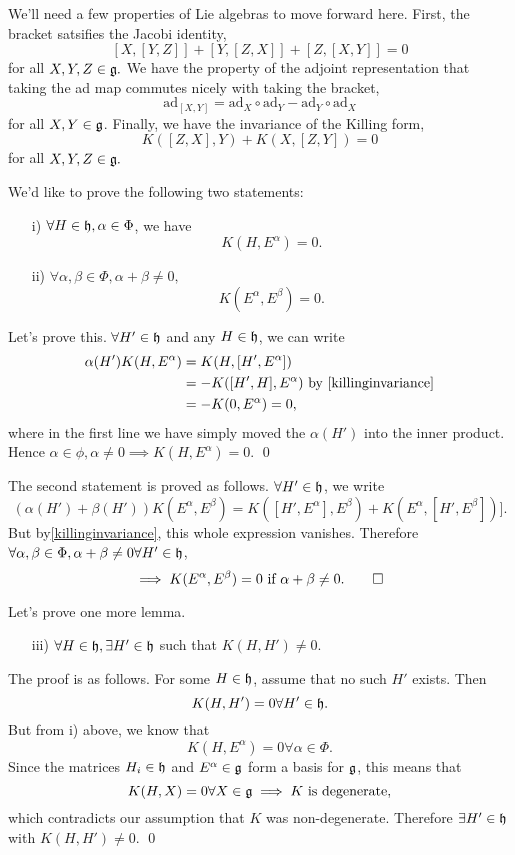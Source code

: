 We'll need a few properties of Lie algebras to move forward here. First, the bracket satsifies the Jacobi identity,
\begin{equation}\label{jacobi}
    [X,[Y,Z]]+[Y,[Z,X]]+[Z,[X,Y]]=0
\end{equation}
for all $X,Y,Z\in \mathfrak{g}.$
We have the property of the adjoint representation that taking the ad map commutes nicely with taking the bracket,
\begin{equation}
    \text{ad}_{[X,Y]}=\text{ad}_X \circ \text{ad}_Y-\text{ad}_Y \circ \text{ad}_X
\end{equation}
for all $X,Y\in \mathfrak{g}$.
Finally, we have the invariance of the Killing form,
\begin{equation}\label{killinginvariance}
    K([Z,X],Y)+K(X,[Z,Y])=0
\end{equation}
for all $X,Y,Z\in \mathfrak{g}.$

We'd like to prove the following two statements:
\begin{enumerate}
    \item[i)] $\forall H\in \mathfrak{h},\alpha\in \Phi$, we have
    $$K(H,E^\alpha)=0.$$
    \item[ii)] $\forall \alpha,\beta\in \Phi, \alpha+\beta \neq 0,$
    $$K(E^\alpha,E^\beta)=0.$$
\end{enumerate}

Let's prove this. $\forall H'\in \mathfrak{h}$ and any $H\in \mathfrak{h}$, we can write
\begin{align*}
\alpha(H')K(H,E^\alpha)&= K(H,[H',E^\alpha])\\
&=-K([H',H],E^\alpha)\text{ by \ref{killinginvariance}}\\
&=-K(0,E^\alpha)=0,
\end{align*}
where in the first line we have simply moved the $\alpha(H')$ into the inner product. Hence $\alpha \in \phi, \alpha\neq 0 \implies K(H,E^\alpha)=0.$ \qed

The second statement is proved as follows. $\forall H'\in \mathfrak{h}$, we write
$$(\alpha(H')+\beta(H'))K(E^\alpha,E^\beta)=K([H',E^\alpha],E^\beta)+K(E^\alpha,[H',E^\beta])].$$
But by\ref{killinginvariance}, this whole expression vanishes. Therefore
$\forall\alpha,\beta\in \Phi, \alpha+\beta \neq 0 \forall H'\in \mathfrak{h}$,
$$\implies K(E^\alpha,E^\beta)=0 \text{ if } \alpha+\beta \neq 0. \qed$$

Let's prove one more lemma. 
\begin{itemize}
    \item[iii)] $\forall H\in \mathfrak{h}, \exists H'\in \mathfrak{h}$ such that $K(H,H')\neq 0.$
\end{itemize}
The proof is as follows. For some $H\in \mathfrak{h}$, assume that no such $H'$ exists. Then $$K(H,H')=0\forall H'\in \mathfrak{h}.$$ But from i) above, we know that
$$K(H,E^\alpha)=0\forall \alpha \in \Phi.$$
Since the matrices $H_i\in \mathfrak{h}$ and $E^\alpha\in \mathfrak{g}$ form a basis for $\mathfrak{g}$, this means that $$K(H,X)=0\forall X \in \mathfrak{g} \implies K \text{ is degenerate}, $$
which contradicts our assumption that $K$ was non-degenerate. Therefore $\exists H'\in \mathfrak{h}$ with $K(H,H')\neq 0$. \qed

